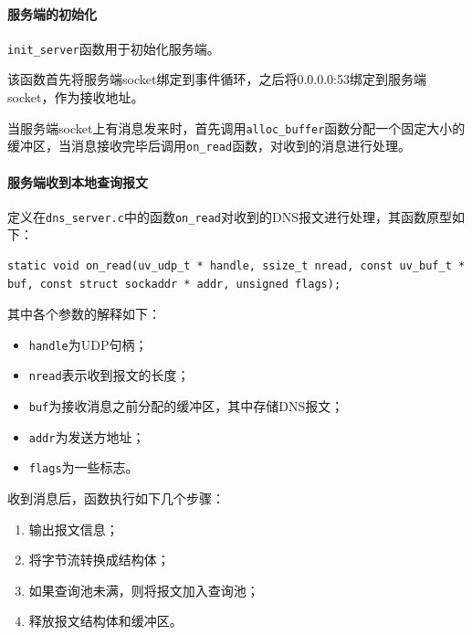 \documentclass[lang=cn,11pt,a4paper,cite=authornum]{paper}
\begin{document}
\paragraph{服务端的初始化}

\texttt{init_server}函数用于初始化服务端。

该函数首先将服务端socket绑定到事件循环，之后将0.0.0.0:53绑定到服务端socket，作为接收地址。

当服务端socket上有消息发来时，首先调用\texttt{alloc_buffer}函数分配一个固定大小的缓冲区，当消息接收完毕后调用\texttt{on_read}函数，对收到的消息进行处理。

\paragraph{服务端收到本地查询报文}

定义在\texttt{dns_server.c}中的函数\texttt{on_read}对收到的DNS报文进行处理，其函数原型如下：

\begin{code}
\begin{verbatim}
static void on_read(uv_udp_t * handle, ssize_t nread, const uv_buf_t * buf, const struct sockaddr * addr, unsigned flags);
\end{verbatim}
\end{code}

其中各个参数的解释如下：

\begin{itemize}
    \item \texttt{handle}为UDP句柄；
    \item \texttt{nread}表示收到报文的长度；
    \item \texttt{buf}为接收消息之前分配的缓冲区，其中存储DNS报文；
    \item \texttt{addr}为发送方地址；
    \item \texttt{flags}为一些标志。
\end{itemize}

收到消息后，函数执行如下几个步骤：

\begin{enumerate}
    \item 输出报文信息；
    \item 将字节流转换成结构体；
    \item 如果查询池未满，则将报文加入查询池；
    \item 释放报文结构体和缓冲区。
\end{enumerate}
\end{document}
